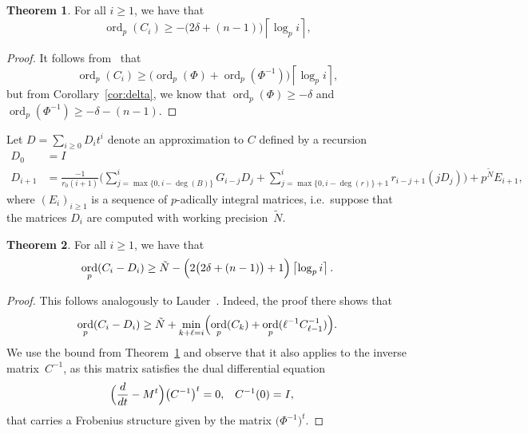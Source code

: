 \documentclass[a4paper,11pt]{article}
\numberwithin{equation}{section}
\providecommand{\ceil}[1]{\left\lceil#1\right\rceil}   %
\DeclareMathOperator{\ord}{ord}          %
\theoremstyle{definition}
\newtheorem{thm}{Theorem}[section]
\begin{document}
\begin{thm} \label{thm:valC}
For all $i \geq 1$, we have that
\begin{equation*}
\ord_p(C_i) \geq - \bigl(2 \delta + (n - 1)\bigr) \ceil{\log_p i},
\end{equation*}
\end{thm}

\begin{proof}
It follows from~\citep[Theorem~{18.3.3}]{Kedlaya2010} that
\begin{equation*}
\ord_p(C_i) \geq \bigl( \ord_p(\Phi) + \ord_p(\Phi^{-1}) \bigr) \ceil{\log_p i},
\end{equation*}
but from Corollary~\ref{cor:delta}, we know that $\ord_p(\Phi) \geq -\delta$ and 
$\ord_p(\Phi^{-1}) \geq -\delta-(n-1)$.
\end{proof}

Let $D=\sum_{i \geq 0} D_i t^i$ denote an approximation to $C$ 
defined by a recursion
\begin{align*}
D_0 &= I \\
D_{i+1} &= \frac{-1}{r_0 (i+1)} \biggl(
    \sum_{j=\max{\{0,i-\deg(B)\}}}^i G_{i-j} D_j + 
    \sum_{j=\max{\{0,i-\deg(r)\}}+1}^i r_{i-j+1} (j D_j) \biggr) + 
    p^{\tilde{N}} E_{i+1},
\end{align*}
where $(E_i)_{i \geq 1}$ is a sequence of $p$-adically integral matrices, 
i.e.\ suppose that the matrices $D_i$ are computed with working 
precision~$\tilde{N}$.

\begin{thm} \label{thm:errorprop}
For all $i \geq 1$, we have that
\begin{equation*}
\ord_p(C_i - D_i) \geq 
    \tilde{N} - \Bigl(2 \bigl(2 \delta + (n-1)\bigr) + 1\Bigr) \ceil{\log_p i}.
\end{equation*}
\end{thm}

\begin{proof}
This follows analogously to
Lauder~\citep[Theorem~5.1]{Lauder2006}.  
Indeed, the proof there shows that 
\begin{equation*}
\ord_p(C_i - D_i) \geq 
    \tilde{N} + \min_{k+\ell=i} \Bigl(\ord_p(C_k) + 
                                      \ord_p(\ell^{-1} C_{\ell-1}^{-1})\Bigr).
\end{equation*}
We use the bound from Theorem~\ref{thm:valC} and observe that it 
also applies to the inverse matrix~$C^{-1}$, as this matrix satisfies 
the dual differential equation 
\begin{align} \label{eq:01-GMDE-Dual}
\Bigl(\frac{d}{dt} - M^t\Bigr) \bigl(C^{-1}\bigr)^t &= 0, &C^{-1}(0)&=I,
\end{align}
that carries a Frobenius structure given by the matrix $\bigl(\Phi^{-1}\bigr)^t$. 
\end{proof}
\end{document}
